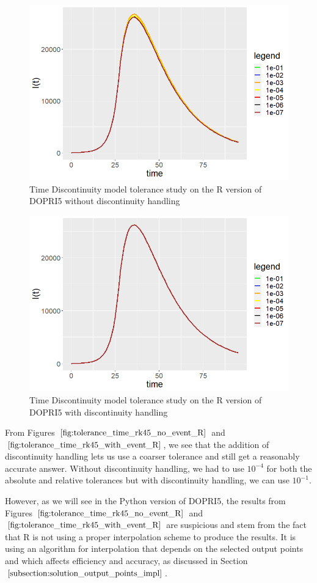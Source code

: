 \begin{figure}[H]
\centering
\includegraphics[width=0.7\linewidth]{./figures/tolerance_time_rk45_no_event_R}
\caption{Time Discontinuity model tolerance study on the R version of DOPRI5 without discontinuity handling}
\label{fig:tolerance_time_rk45_no_event_R}
\end{figure}

\begin{figure}[H]
\centering
\includegraphics[width=0.7\linewidth]{./figures/tolerance_time_rk45_with_event_R}
\caption{Time Discontinuity model tolerance study on the R version of DOPRI5 with discontinuity handling}
\label{fig:tolerance_time_rk45_with_event_R}
\end{figure}

From Figures $\ref{fig:tolerance_time_rk45_no_event_R}$ and $\ref{fig:tolerance_time_rk45_with_event_R}$, we see that the addition of discontinuity handling lets us use a coarser tolerance and still get a reasonably accurate answer. Without discontinuity handling, we had to use $10^{-4}$ for both the absolute and relative tolerances but with discontinuity handling, we can use $10^{-1}$. 

However, as we will see in the Python version of DOPRI5, the results from Figures $\ref{fig:tolerance_time_rk45_no_event_R}$ and $\ref{fig:tolerance_time_rk45_with_event_R}$ are suspicious and stem from the fact that R is not using a proper interpolation scheme to produce the results. It is using an algorithm for interpolation that depends on the selected output points and which affects efficiency and accuracy, as discussed in Section $\ref{subsection:solution_output_points_impl}$. 

